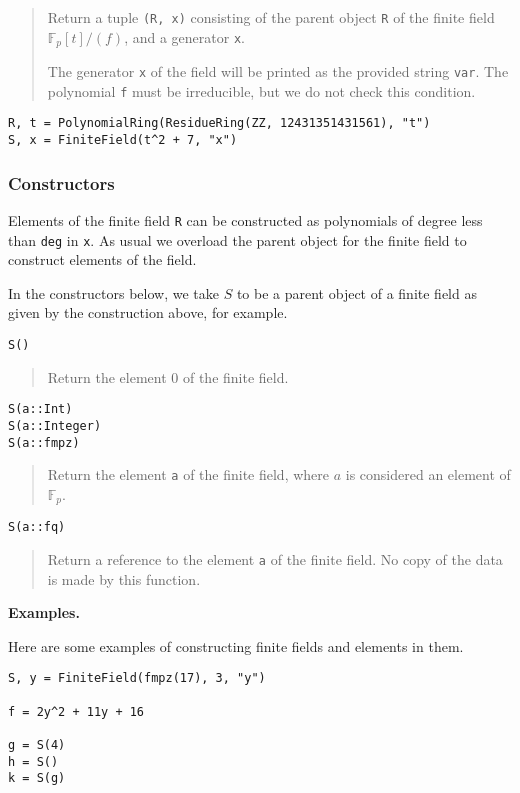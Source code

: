 \documentclass[a4paper,10pt]{article}
\newcommand{\F}{\mathbb{F}}
\newcommand{\code}{\lstinline}
\newcommand{\desc}[1]{\vspace{-3mm}\begin{quote}#1\end{quote}}
\begin{document}
{{\desc{Return a tuple \code{(R, x)} consisting of the parent object \code{R} of
the finite field $\F_p[t]/(f)$, and a generator \code{x}.

The generator \code{x} of the field will be printed as the provided string
\code{var}. The polynomial \code{f} must be irreducible, but we do not check this
condition.}

\begin{lstlisting}
R, t = PolynomialRing(ResidueRing(ZZ, 12431351431561), "t")
S, x = FiniteField(t^2 + 7, "x")
\end{lstlisting}

\subsubsection{Constructors}

Elements of the finite field \code{R} can be constructed as polynomials of
degree less than \code{deg} in \code{x}. As usual we overload the parent object
for the finite field to construct elements of the field.

In the constructors below, we take $S$ to be a parent object of a finite field
as given by the construction above, for example.

\begin{lstlisting}
S()
\end{lstlisting}

\desc{Return the element $0$ of the finite field.}

\begin{lstlisting}
S(a::Int)
S(a::Integer)
S(a::fmpz)
\end{lstlisting}

\desc{Return the element \code{a} of the finite field, where $a$ is considered 
an element of $\F_p$.}

\begin{lstlisting}
S(a::fq)
\end{lstlisting}

\desc{Return a reference to the element \code{a} of the finite field. No copy
of the data is made by this function.}

\textbf{Examples.}

Here are some examples of constructing finite fields and elements in them.

\begin{lstlisting}
S, y = FiniteField(fmpz(17), 3, "y")

f = 2y^2 + 11y + 16

g = S(4)
h = S()
k = S(g)
\end{lstlisting}

}}
\end{document}
